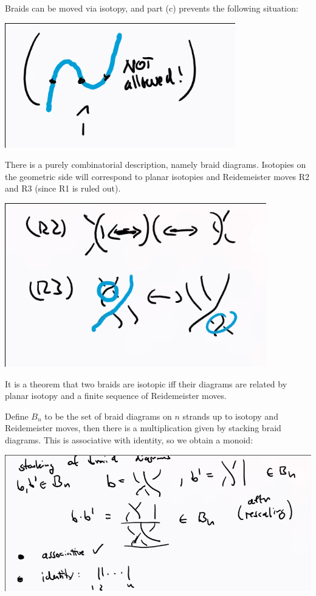 Braids can be moved via isotopy, and part (c) prevents the following
situation:

\includegraphics{figures/image_2020-07-08-11-38-02.png}

There is a purely combinatorial description, namely braid diagrams.
Isotopies on the geometric side will correspond to planar isotopies and
Reidemeister moves R2 and R3 (since R1 is ruled out).

\includegraphics{figures/image_2020-07-08-11-42-13.png}

It is a theorem that two braids are isotopic iff their diagrams are
related by planar isotopy and a finite sequence of Reidemeister moves.

Define \(B_n\) to be the set of braid diagrams on \(n\) strands up to
isotopy and Reidemeister moves, then there is a multiplication given by
stacking braid diagrams. This is associative with identity, so we obtain
a monoid:

\includegraphics{figures/image_2020-07-08-11-45-36.png}

